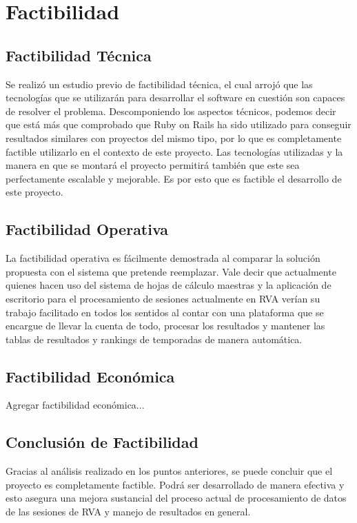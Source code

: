 \chapter{Factibilidad}

\section{Factibilidad Técnica}
Se realizó un estudio previo de factibilidad técnica, el cual arrojó que las tecnologías que se utilizarán para desarrollar el software en cuestión son capaces de resolver el problema.
Descomponiendo los aspectos técnicos, podemos decir que está más que comprobado que Ruby on Rails ha sido utilizado para conseguir resultados similares con proyectos del mismo tipo, por lo que es completamente factible utilizarlo en el contexto de este proyecto.
Las tecnologías utilizadas y la manera en que se montará el proyecto permitirá también que este sea perfectamente escalable y mejorable.
Es por esto que es factible el desarrollo de este proyecto.

\section{Factibilidad Operativa}
La factibilidad operativa es fácilmente demostrada al comparar la solución propuesta con el sistema que pretende reemplazar. Vale decir que actualmente quienes hacen uso del sistema de hojas de cálculo maestras y la aplicación de escritorio para el procesamiento de sesiones actualmente en RVA verían su trabajo facilitado en todos los sentidos al contar con una plataforma que se encargue de llevar la cuenta de todo, procesar los resultados y mantener las tablas de resultados y rankings de temporadas de manera automática.

\section{Factibilidad Económica}
Agregar factibilidad económica...

\section{Conclusión de Factibilidad}
Gracias al análisis realizado en los puntos anteriores, se puede concluir que el proyecto es completamente factible. Podrá ser desarrollado de manera efectiva y esto asegura una mejora sustancial del proceso actual de procesamiento de datos de las sesiones de RVA y manejo de resultados en general.
